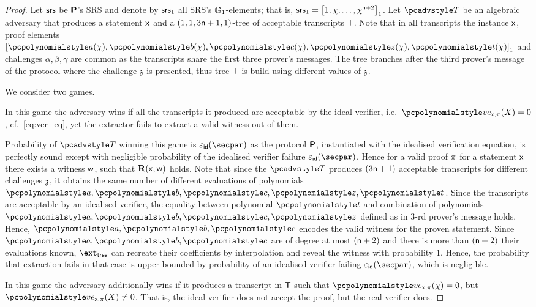 \iffalse
\begin{proof}
	Let $\mathsf{srs}$ be $\bm{\mathsf{P}}$'s SRS and denote by $\mathsf{srs}_1$ all SRS's
  $\mathbb{G}_1$-elements; that is, $\mathsf{srs}_1 = \left[1, \chi, \ldots, \chi^{\mathsf{n} +
      2}\right]_{1}$. Let $\tdv$ be an algebraic adversary that produces a statement $\mathsf{x}$ and
  a $(1, 1, 3\mathsf{n} + 1, 1)$-tree of acceptable transcripts $\mathsf{T}$.  Note that in
  all transcripts the instance $\mathsf{x}$, proof elements
  $\gone{\p{a}(\chi), \p{b}(\chi), \p{c}(\chi), \p{z}(\chi), \p{t}(\chi)}$ and
  challenges $\alpha, \beta, \gamma$ are common as the transcripts share the first
  three prover's messages. The tree branches after the third prover's message of the
  protocol where the challenge $\mathfrak{z}$ is presented, thus tree $\mathsf{T}$ is build using
  different values of $\mathfrak{z}$.
	
	We consider two games.
	
	 In this game the adversary wins if all the transcripts it
	produced are acceptable by the ideal verifier,
	i.e.~$\vereq_{\inp, \zkproof}(X) = 0$, cf.~\cref{eq:ver_eq}, yet the extractor
	fails to extract a valid witness out of them.
	
	Probability of $\tdv$ winning this game is $\epsid(\secpar)$ as the protocol
	$\bm{\mathsf{P}}$, instantiated with the idealised verification equation, is
	perfectly sound except with negligible probability of the idealised verifier
	failure $\epsid(\secpar)$. Hence for a valid proof $\pi$ for a statement
	$\mathsf{x}$ there exists a witness $\mathsf{w}$, such that $\mathbf{R}(\mathsf{x}, \mathsf{w})$ holds. Note
	that since the $\tdv$ produces $(3 \mathsf{n} + 1)$ acceptable transcripts for
	different challenges $\mathfrak{z}$, it obtains the same number of different
	evaluations of polynomials $\p{a}, \p{b}, \p{c}, \p{z}, \p{t}$. Since the
	transcripts are acceptable by an idealised verifier, the equality between
	polynomial $\p{t}$ and combination of polynomials $\p{a}, \p{b}, \p{c}, \p{z}$
	defined as in $3$-rd prover's message holds. Hence, $\p{a}, \p{b}, \p{c}$
	encodes the valid witness for the proven statement. Since
	$\p{a}, \p{b}, \p{c}$ are of degree at most $(\mathsf{n} + 2)$ and there is more
	than $(\mathsf{n} + 2)$ their evaluations known, $\extt$ can recreate their
	coefficients by interpolation and reveal the witness with probability
	$1$. Hence, the probability that extraction fails in that case is
	upper-bounded by probability of an idealised verifier failing
	$\epsid(\secpar)$, which is negligible.
	
	 In this game the adversary additionally wins if it produces a
	transcript in $\mathsf{T}$ such that $\vereq_{\inp, \zkproof}(\chi) = 0$, but
	$\vereq_{\inp, \zkproof}(X) \neq 0$. That is, the ideal verifier does not
	accept the proof, but the real verifier does.
	

\end{proof}
